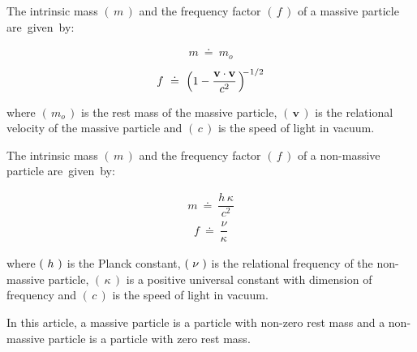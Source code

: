 \documentclass[10pt,fleqn]{article}
\begin{document}
\noindent The intrinsic mass $( \, m \, )$ and the frequency factor $( \, f \, )$ of a massive particle \hbox {are given by}:
\par \vspace{-0.60em}
\begin{eqnarray*}
m ~\doteq~ m_o
\end{eqnarray*}
\vspace{-0.90em}
\begin{eqnarray*}
f ~\doteq~ \Big ( 1 - \dfrac{\mathbf{v} \cdot \mathbf{v}}{c^2} \hspace{+0.15em} \Big )^{\hspace{-0.24em}-\hspace{+0.03em}1/2}
\end{eqnarray*}
\par \vspace{+0.60em}
\noindent where $( \, m_o \, )$ is the rest mass of the massive particle, $( \, \mathbf{v} \, )$ is the relational velocity of the massive particle and $( \, c \, )$ is the speed of light in vacuum.
\par \vspace{+0.60em}
\noindent The intrinsic mass $( \, m \, )$ and the frequency factor $( \, f \, )$ of a non-massive particle \hbox {are given by}:
\par \vspace{-0.60em}
\begin{eqnarray*}
m ~\doteq~ \dfrac{h \, \kappa}{c^2}
\end{eqnarray*}
\vspace{-0.60em}
\begin{eqnarray*}
f ~\doteq~ \dfrac{\nu}{\kappa}
\end{eqnarray*}
\par \vspace{+0.60em}
\noindent where $( \hspace{+0.33em} h \hspace{+0.33em} )$ is the Planck constant, \hspace{+0.06em}$( \hspace{+0.30em} \nu \hspace{+0.30em} )$ is the relational frequency of the \hbox {non-massive} particle, $( \, \kappa \, )$ is a positive universal constant with dimension of frequency and $( \, c \, )$ is the speed of light in vacuum.
\par \vspace{+0.60em}
\noindent In this article, a massive particle is a particle with non-zero rest mass and a non-massive particle is a particle with zero rest mass.
\end{document}

